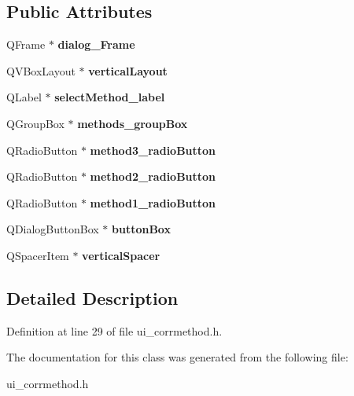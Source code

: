 \subsection*{Public Attributes}
\begin{DoxyCompactItemize}
\item 
\hypertarget{classUi__CorrMethodClass_ab3e404afe1c6fafb99e02a2a9315e8d1}{
QFrame $\ast$ {\bfseries dialog\_\-Frame}}
\label{classUi__CorrMethodClass_ab3e404afe1c6fafb99e02a2a9315e8d1}

\item 
\hypertarget{classUi__CorrMethodClass_aab4f631b545d0545adde08190ecab6fa}{
QVBoxLayout $\ast$ {\bfseries verticalLayout}}
\label{classUi__CorrMethodClass_aab4f631b545d0545adde08190ecab6fa}

\item 
\hypertarget{classUi__CorrMethodClass_add008cc6d16e9265345255c6fbc2e0b5}{
QLabel $\ast$ {\bfseries selectMethod\_\-label}}
\label{classUi__CorrMethodClass_add008cc6d16e9265345255c6fbc2e0b5}

\item 
\hypertarget{classUi__CorrMethodClass_a55e61e05e9ff340d17b08f7489e84039}{
QGroupBox $\ast$ {\bfseries methods\_\-groupBox}}
\label{classUi__CorrMethodClass_a55e61e05e9ff340d17b08f7489e84039}

\item 
\hypertarget{classUi__CorrMethodClass_aa260d1145f60cdc7137a93d50f66b2e9}{
QRadioButton $\ast$ {\bfseries method3\_\-radioButton}}
\label{classUi__CorrMethodClass_aa260d1145f60cdc7137a93d50f66b2e9}

\item 
\hypertarget{classUi__CorrMethodClass_acced16b55f7c8baa3c789435616c35c6}{
QRadioButton $\ast$ {\bfseries method2\_\-radioButton}}
\label{classUi__CorrMethodClass_acced16b55f7c8baa3c789435616c35c6}

\item 
\hypertarget{classUi__CorrMethodClass_a091300f07ee518675317d2001e486a42}{
QRadioButton $\ast$ {\bfseries method1\_\-radioButton}}
\label{classUi__CorrMethodClass_a091300f07ee518675317d2001e486a42}

\item 
\hypertarget{classUi__CorrMethodClass_ac4d190aefc50d332cfdc73d7370f4ca2}{
QDialogButtonBox $\ast$ {\bfseries buttonBox}}
\label{classUi__CorrMethodClass_ac4d190aefc50d332cfdc73d7370f4ca2}

\item 
\hypertarget{classUi__CorrMethodClass_ac98460426d7a9f1c1a2763d9e3c0c2ef}{
QSpacerItem $\ast$ {\bfseries verticalSpacer}}
\label{classUi__CorrMethodClass_ac98460426d7a9f1c1a2763d9e3c0c2ef}

\end{DoxyCompactItemize}


\subsection{Detailed Description}


Definition at line 29 of file ui\_\-corrmethod.h.

The documentation for this class was generated from the following file:\begin{DoxyCompactItemize}
\item 
ui\_\-corrmethod.h\end{DoxyCompactItemize}
